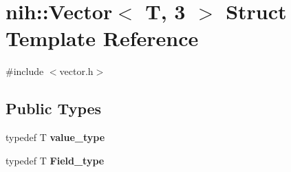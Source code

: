 \hypertarget{structnih_1_1_vector_3_01_t_00_013_01_4}{
\section{nih\-:\-:\-Vector$<$ \-T, 3 $>$ \-Struct \-Template \-Reference}
\label{structnih_1_1_vector_3_01_t_00_013_01_4}
}


{\ttfamily \#include $<$vector.\-h$>$}

\subsection*{\-Public \-Types}
\begin{DoxyCompactItemize}
\item 
\hypertarget{structnih_1_1_vector_3_01_t_00_013_01_4_a3c013dfbd877252c7c7d2b0f7645d2ae}{
typedef \-T {\bfseries value\-\_\-type}}
\label{structnih_1_1_vector_3_01_t_00_013_01_4_a3c013dfbd877252c7c7d2b0f7645d2ae}

\item 
\hypertarget{structnih_1_1_vector_3_01_t_00_013_01_4_a51363c71ac4e9ed4c6936926cc681b77}{
typedef \-T {\bfseries \-Field\-\_\-type}}
\label{structnih_1_1_vector_3_01_t_00_013_01_4_a51363c71ac4e9ed4c6936926cc681b77}

\end{DoxyCompactItemize}
